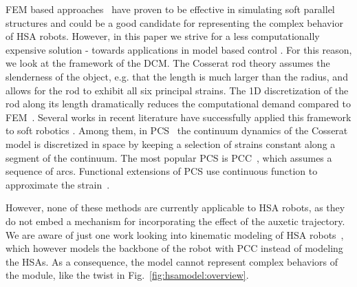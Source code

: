 \gls{FEM} based approaches~\cite{farrell2020extension} have proven to be effective in simulating soft parallel structures \cite{vanneste2021enabling} and could be a good candidate for representing the complex behavior of \gls{HSA} robots. However, in this paper we strive for a less computationally expensive solution - towards applications in model based control \cite{della2023model}. For this reason, we look at the framework of the \gls{DCM}. The Cosserat rod theory assumes the slenderness of the object, e.g. that the length is much larger than the radius, and allows for the rod to exhibit all six principal strains. The 1D discretization of the rod along its length dramatically reduces the computational demand compared to \gls{FEM}~\cite{gazzola2018forward}. 
%
Several works in recent literature have successfully applied this framework to soft robotics \cite{grazioso2019geometrically,sadati2021tmtdyn,armanini2023soft}. Among them, in \gls{PCS}~\cite{renda2018discrete} the continuum dynamics of the Cosserat model is discretized in space by keeping a selection of strains constant along a segment of the continuum. %
The most popular \gls{PCS} is \gls{PCC}~\cite{webster2010design}, which assumes a sequence of arcs. Functional extensions of \gls{PCS} use continuous function to approximate the strain~\cite{della2019control,renda2020geometric}. %

However, none of these methods are currently applicable to HSA robots, as they do not embed a mechanism for incorporating the effect of the auxetic trajectory.
%
We are aware of just one work looking into kinematic modeling of HSA robots~\cite{garg2022kinematic}, which however models the backbone of the robot with \gls{PCC} instead of modeling the HSAs. As a consequence, the model cannot represent complex behaviors of the module, like the twist in Fig.~\ref{fig:hsamodel:overview}. 

